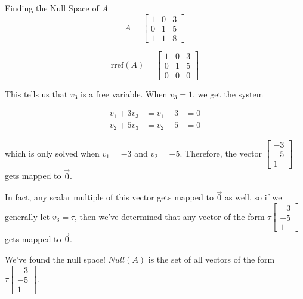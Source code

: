 \documentclass{ximera}
\begin{document}
\begin{exploration}{Finding the Null Space of $A$}
$$A=\begin{bmatrix} 1 & 0 & 3 \\ 0 & 1 & 5 \\ 1 & 1 & 8 \end{bmatrix}$$

$$\text{rref}(A)=\begin{bmatrix} 1 & 0 & 3 \\ 0 & 1 & 5 \\ 0 & 0 & 0 \end{bmatrix}$$

This tells us that $v_3$ is a free variable. When $v_3=1$, we get the system 

\[
\begin{aligned}
    v_1 + 3v_3 &= v_1+3&=0 \\
    v_2 + 5v_3 &= v_2+5&=0
\end{aligned}
\]

which is only solved when $v_1=-3$ and $v_2=-5$. Therefore, the vector $\begin{bmatrix} -3 \\ -5 \\ 1 \end{bmatrix}$ gets mapped to $\vec{0}$.

In fact, any scalar multiple of this vector gets mapped to $\vec{0}$ as well, so if we generally let $v_3=\tau$, then we've determined that any vector of the form $\tau \begin{bmatrix} -3 \\ -5 \\ 1 \end{bmatrix}$ gets mapped to $\vec{0}$. 

We've found the null space! $Null(A)$ is the set of all vectors of the form $\tau \begin{bmatrix} -3 \\ -5 \\ 1 \end{bmatrix}$.

\end{exploration}
\end{document}
